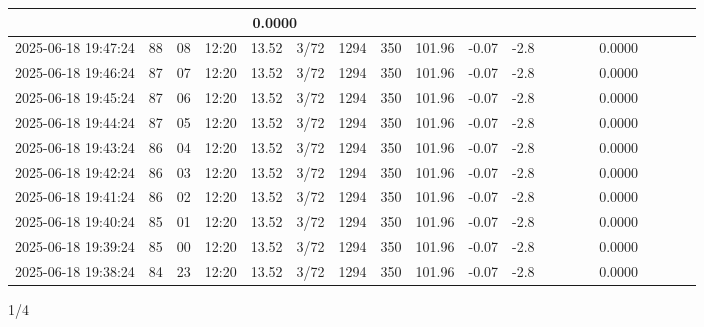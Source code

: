 \documentclass[UTF8,10pt,a4paper,fontset=fandol]{ctexart}
\begin{document}
\begin{center}
{\begin{tabular}{|p{2.9cm}|c|c|c|c|c|c|c|c|c|c|*{15}{c|}}
\multicolumn{15}{c|}{0.0000} \\ \hline
2025-06-18 19:47:24 & 88 & 08 & 12:20 & 13.52 & 3/72 & 1294 & 350 & 101.96 & -0.07 & -2.8 &
\multicolumn{15}{c|}{0.0000} \\ \hline
2025-06-18 19:46:24 & 87 & 07 & 12:20 & 13.52 & 3/72 & 1294 & 350 & 101.96 & -0.07 & -2.8 &
\multicolumn{15}{c|}{0.0000} \\ \hline
2025-06-18 19:45:24 & 87 & 06 & 12:20 & 13.52 & 3/72 & 1294 & 350 & 101.96 & -0.07 & -2.8 &
\multicolumn{15}{c|}{0.0000} \\ \hline
2025-06-18 19:44:24 & 87 & 05 & 12:20 & 13.52 & 3/72 & 1294 & 350 & 101.96 & -0.07 & -2.8 &
\multicolumn{15}{c|}{0.0000} \\ \hline
2025-06-18 19:43:24 & 86 & 04 & 12:20 & 13.52 & 3/72 & 1294 & 350 & 101.96 & -0.07 & -2.8 &
\multicolumn{15}{c|}{0.0000} \\ \hline
2025-06-18 19:42:24 & 86 & 03 & 12:20 & 13.52 & 3/72 & 1294 & 350 & 101.96 & -0.07 & -2.8 &
\multicolumn{15}{c|}{0.0000} \\ \hline
2025-06-18 19:41:24 & 86 & 02 & 12:20 & 13.52 & 3/72 & 1294 & 350 & 101.96 & -0.07 & -2.8 &
\multicolumn{15}{c|}{0.0000} \\ \hline
2025-06-18 19:40:24 & 85 & 01 & 12:20 & 13.52 & 3/72 & 1294 & 350 & 101.96 & -0.07 & -2.8 &
\multicolumn{15}{c|}{0.0000} \\ \hline
2025-06-18 19:39:24 & 85 & 00 & 12:20 & 13.52 & 3/72 & 1294 & 350 & 101.96 & -0.07 & -2.8 &
\multicolumn{15}{c|}{0.0000} \\ \hline
2025-06-18 19:38:24 & 84 & 23 & 12:20 & 13.52 & 3/72 & 1294 & 350 & 101.96 & -0.07 & -2.8 &
\multicolumn{15}{c|}{0.0000} \\ \hline
\end{tabular}%
}
\end{center}

\begin{flushright}
1/4
\end{flushright}

\newpage
\end{document}
